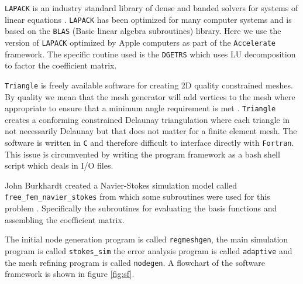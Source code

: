 \documentclass[wrr]{agutex}  %
\begin{document}
\begin{article}
{\tt LAPACK} is an industry standard library of dense and banded solvers for systems of linear equations \citep{Anderson1999}.  {\tt LAPACK} has been optimized for many computer systems and is based on the {\tt BLAS} (Basic linear algebra subroutines) library.  Here we use the version of {\tt LAPACK} optimized by Apple computers as part of the {\tt Accelerate} framework.  The specific routine used is the {\tt DGETRS} which uses LU decomposition to factor the coefficient matrix.  
	
{\tt Triangle} is freely available software for creating 2D quality constrained meshes.  By quality we mean that the mesh generator will add vertices to the mesh where appropriate to ensure that a minimum angle requirement is met \citep{Shewchuk1996}.  {\tt Triangle} creates a conforming constrained Delaunay triangulation where each triangle in not necessarily Delaunay but that does not matter for a finite element mesh.  The software is written in {\tt C} and therefore difficult to interface directly with {\tt Fortran}.  This issue is circumvented by writing the program framework as a bash shell script which deals in I/O files. 

John Burkhardt created a Navier-Stokes simulation model called {\tt free\_fem\_navier\_stokes} from which some subroutines were used for this problem \citep{Burkardt2007}.  Specifically the subroutines for evaluating the basis functions and assembling the coefficient matrix.  

The initial node generation program is called {\tt regmeshgen}, the main simulation program is called {\tt stokes\_sim} the error analysis program is called {\tt adaptive} and the mesh refining program is called {\tt nodegen}.  A flowchart of the software framework is shown in figure \ref{fig:sf}.
 

\begin{figure}[h]
\end{figure}
\end{article}
\end{document}
